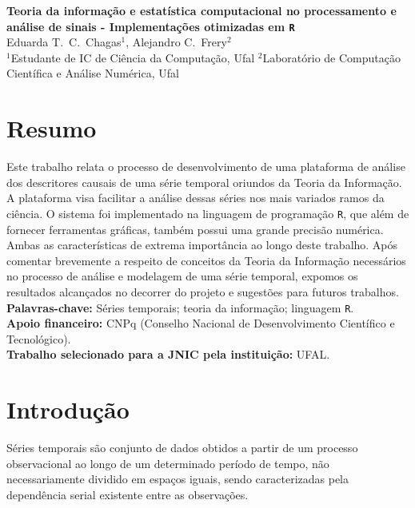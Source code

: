 \documentclass[journal,a4paper,11pt]{IEEEtran}
\begin{document}
\begin{center}
\vspace{0.2cm}
	
	\textbf{Teoria da informação e estatística computacional no processamento e análise de sinais - Implementações otimizadas em \texttt R}\\ 
    
	Eduarda T.\ C.\ Chagas$^{1}$, Alejandro C.\ Frery$^{2}$\\
     $^{1}$Estudante de IC de Ciência da Computação, Ufal
     $^{2}$Laboratório de Computação Científica e Análise Numérica, Ufal
    
\end{center}
\section*{\textbf{Resumo}}

	Este trabalho relata o processo de desenvolvimento de uma plataforma de análise dos descritores causais de uma série temporal oriundos da Teoria da Informação.
 	A plataforma visa facilitar a análise dessas séries nos mais variados ramos da ciência. 
 	O sistema foi implementado na linguagem de programação \texttt R, que além de fornecer ferramentas gráficas, também possui uma grande precisão numérica. 
 	Ambas as características de extrema importância ao longo deste trabalho.
 Após comentar brevemente a respeito de conceitos da Teoria da Informação necessários no processo de análise e modelagem de uma série temporal, expomos os resultados alcançados no decorrer do projeto e sugestões para futuros trabalhos.\\

\textbf{Palavras-chave:} Séries temporais; teoria da informação; linguagem \texttt R.\\

\textbf{Apoio financeiro:} CNPq (Conselho Nacional de Desenvolvimento Científico e Tecnológico).\\

\textbf{Trabalho selecionado para a JNIC pela instituição:} UFAL.

\section*{\textbf{Introdução}}

	Séries temporais são conjunto de dados obtidos a partir de um processo observacional ao longo de um determinado período de tempo, não necessariamente dividido em espaços iguais, sendo caracterizadas pela dependência serial existente entre as observações.
 
\end{document}
